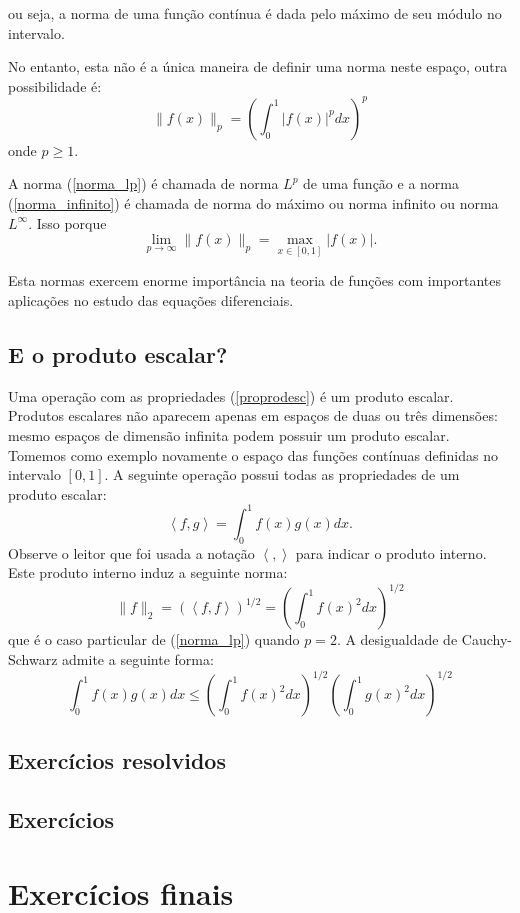 ou seja, a norma de uma função contínua é dada pelo máximo de seu módulo no intervalo.

No entanto, esta não é a única maneira de definir uma norma neste espaço, outra possibilidade é:
\begin{equation}\label{norma_lp}\|f(x)\|_{p}=\left(\int_0^1|f(x)|^pdx\right)^p\end{equation}
onde $p\geq 1$.

A norma (\ref{norma_lp}) é chamada de norma $L^p$ de uma função e a norma (\ref{norma_infinito}) é chamada de norma do máximo ou norma infinito ou norma $L^{\infty}$. Isso porque
$$\lim_{p\to\infty}\|f(x)\|_{p}=\max_{x\in [0,1]}|f(x)|.$$

Esta normas exercem enorme importância na teoria de funções com importantes aplicações no estudo das equações diferenciais. 

\subsection{E o produto escalar?}
Uma operação com as propriedades (\ref{proprodesc}) é um produto escalar. Produtos escalares não aparecem apenas em espaços de duas ou três dimensões: mesmo espaços de dimensão infinita podem possuir um produto escalar. Tomemos como exemplo novamente o espaço das funções contínuas definidas no intervalo $[0,1]$. A seguinte operação possui todas as propriedades de um produto escalar:
$$\left<f,g\right>=\int_0^1f(x)g(x)dx.$$
Observe o leitor que foi usada a notação $\left<,\right>$ para indicar o produto interno. Este produto interno induz a seguinte norma:
$$\|f\|_2=\left(\left<f,f\right>\right)^{1/2}=\left(\int_0^1f(x)^2dx\right)^{1/2}$$
que é o caso particular de (\ref{norma_lp}) quando $p=2$. 
 A desigualdade de Cauchy-Schwarz admite a seguinte forma:
$$\int_0^1f(x)g(x)dx \leq \left(\int_0^1f(x)^2dx\right)^{1/2} \left(\int_0^1g(x)^2dx\right)^{1/2}$$
 
 
\subsection*{Exercícios resolvidos}

\construirExeresol

\subsection*{Exercícios}

\construirExer

\section{Exercícios finais}

\construirExer
